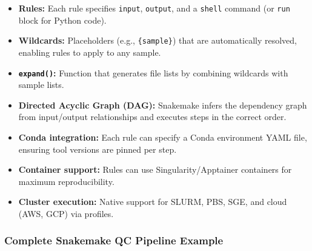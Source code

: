 \begin{itemize}[itemsep=2pt]
  \item \textbf{Rules:} Each rule specifies \texttt{input}, \texttt{output}, and a \texttt{shell} command (or \texttt{run} block for Python code).
  \item \textbf{Wildcards:} Placeholders (e.g., \texttt{\{sample\}}) that are automatically resolved, enabling rules to apply to any sample.
  \item \textbf{\texttt{expand()}:} Function that generates file lists by combining wildcards with sample lists.
  \item \textbf{Directed Acyclic Graph (DAG):} Snakemake infers the dependency graph from input/output relationships and executes steps in the correct order.
  \item \textbf{Conda integration:} Each rule can specify a Conda environment YAML file, ensuring tool versions are pinned per step.
  \item \textbf{Container support:} Rules can use Singularity/Apptainer containers for maximum reproducibility.
  \item \textbf{Cluster execution:} Native support for SLURM, PBS, SGE, and cloud (AWS, GCP) via profiles.
\end{itemize}

\subsubsection{Complete Snakemake QC Pipeline Example}

